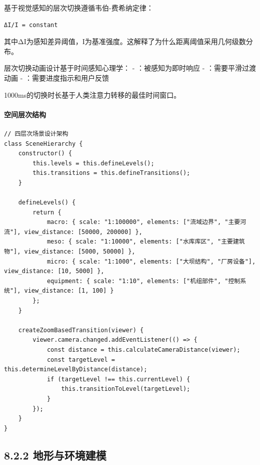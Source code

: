 
基于视觉感知的层次切换遵循韦伯-费希纳定律：

\begin{lstlisting}
ΔI/I = constant
\end{lstlisting}

其中ΔI为感知差异阈值，I为基准强度。这解释了为什么距离阈值采用几何级数分布。


层次切换动画设计基于时间感知心理学： - ：被感知为即时响应 - ：需要平滑过渡动画 - ：需要进度指示和用户反馈

1000ms的切换时长基于人类注意力转移的最佳时间窗口。

\hypertarget{ux7a7aux95f4ux5c42ux6b21ux7ed3ux6784}{%
\paragraph{空间层次结构}\label{ux7a7aux95f4ux5c42ux6b21ux7ed3ux6784}}

\begin{lstlisting}[style=javascript]
// 四层次场景设计架构
class SceneHierarchy {
    constructor() {
        this.levels = this.defineLevels();
        this.transitions = this.defineTransitions();
    }
    
    defineLevels() {
        return {
            macro: { scale: "1:100000", elements: ["流域边界", "主要河流"], view_distance: [50000, 200000] },
            meso: { scale: "1:10000", elements: ["水库库区", "主要建筑物"], view_distance: [5000, 50000] },
            micro: { scale: "1:1000", elements: ["大坝结构", "厂房设备"], view_distance: [10, 5000] },
            equipment: { scale: "1:10", elements: ["机组部件", "控制系统"], view_distance: [1, 100] }
        };
    }
    
    createZoomBasedTransition(viewer) {
        viewer.camera.changed.addEventListener(() => {
            const distance = this.calculateCameraDistance(viewer);
            const targetLevel = this.determineLevelByDistance(distance);
            if (targetLevel !== this.currentLevel) {
                this.transitionToLevel(targetLevel);
            }
        });
    }
}
\end{lstlisting}

\hypertarget{ux5730ux5f62ux4e0eux73afux5883ux5efaux6a21}{%
\subsection{8.2.2 地形与环境建模}\label{ux5730ux5f62ux4e0eux73afux5883ux5efaux6a21}}

